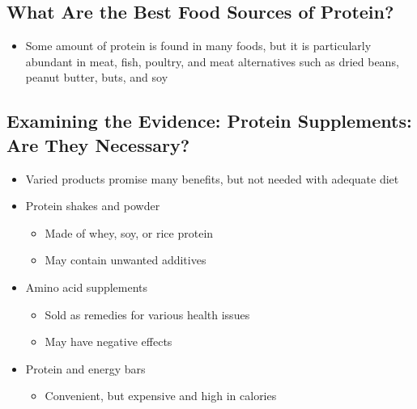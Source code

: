 \documentclass[12pt]{article}
\begin{document}
        \subsection{What Are the Best Food Sources of Protein?}
            \begin{itemize}
                \item Some amount of protein is found in many foods, but it is particularly abundant in meat, fish, poultry, and meat alternatives such as dried beans, peanut butter, buts, and soy
            \end{itemize}

        \subsection{Examining the Evidence: Protein Supplements: Are They Necessary?}
            \begin{itemize}
                \item Varied products promise many benefits, but not needed with adequate diet
                \item Protein shakes and powder
                    \begin{itemize}
                        \item Made of whey, soy, or rice protein
                        \item May contain unwanted additives
                    \end{itemize}
                \item Amino acid supplements
                    \begin{itemize}
                        \item Sold as remedies for various health issues
                        \item May have negative effects
                    \end{itemize}
                \item Protein and energy bars
                    \begin{itemize}
                        \item Convenient, but expensive and high in calories
                    \end{itemize}
            \end{itemize}
\end{document}
